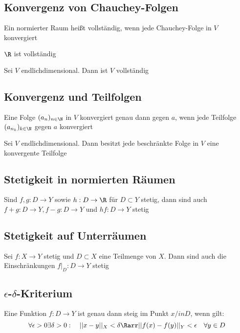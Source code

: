 	\subsection{Konvergenz von Chauchey-Folgen}
		\begin{Definition} [Vollständig]
			Ein normierter Raum heißt vollständig, wenn jede Chauchey-Folge in $V$ konvergiert
		\end{Definition}
		\begin{Satz} [ ]
			$\R$ ist vollständig
		\end{Satz}
		\begin{Satz} [ ]
			Sei $V$ endlichdimensional. Dann ist $V$ vollständig
		\end{Satz}
	\subsection{Konvergenz und Teilfolgen}
		\begin{Satz} [ ]
			Eine Folge $(a_n)_{n\in \N}$ in $V$ konvergiert genau dann gegen $a$, wenn jede Teilfolge $(a_{n_k})_{k\in\N}$ gegen $a$ konvergiert
		\end{Satz}
		\begin{Satz} 
			Sei $V$ endlichdimensional. Dann besitzt jede beschränkte Folge in $V$ eine konvergente Teilfolge
		\end{Satz}
	\subsection{Stetigkeit in normierten Räumen}
		\begin{Satz} [ ]
					Sind $f, g: D\to Y$ sowie $h: D\to \R$ für $D\subset Y$ stetig, dann sind auch $f + g: D\to Y, f-g: D\to Y$ und $hf: D\to Y$ stetig
		\end{Satz}
	\subsection{Stetigkeit auf Unterräumen}
		\begin{Satz} [ ]
			Sei $f: X\to Y$ stetig und $D \subset X$ eine Teilmenge von $X$. Dann sind auch die Einschränkungen $f|_D:D\to Y$ stetig
		\end{Satz}
	\subsection{$\epsilon$-$\delta$-Kriterium}
		\begin{Satz} [ ]
			Eine Funktion $f: D\to Y$ ist genau dann steig im Punkt $x/in D$, wenn gilt:
			$$
				\forall \epsilon > 0\exists\delta>0: \quad ||x-y||_X < \delta \Rarr ||f(x)-f(y)||_Y<\epsilon \quad \forall y\in D
			$$
		\end{Satz}
